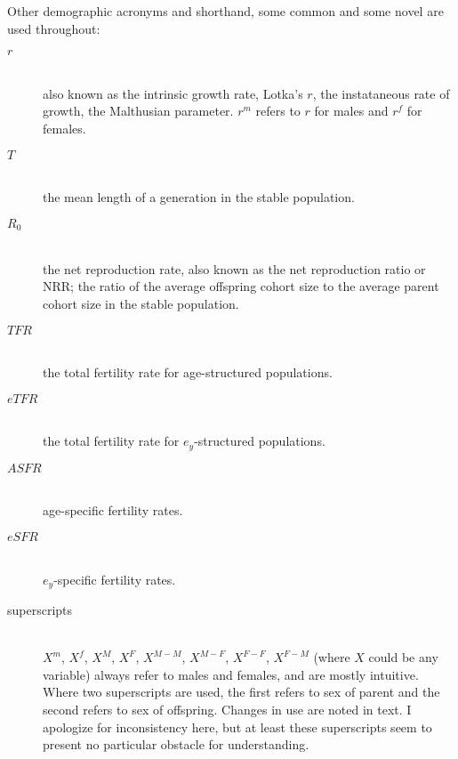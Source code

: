 Other demographic acronyms and shorthand, some common and some novel are used
throughout:
\begin{description}
  \item[$r$] \hfill \\ also known as the intrinsic growth rate, Lotka's $r$, the
  instataneous rate of growth, the Malthusian parameter. $r^m$ refers to $r$ for
  males and $r^f$ for females.
  \item [$T$] \hfill \\ the mean length of a generation in the stable
  population.
  \item [$R_0$] \hfill \\ the net reproduction rate, also known as the net
  reproduction ratio or NRR; the ratio of the average offspring cohort size to the average
  parent cohort size in the stable population.
  \item [$TFR$] \hfill \\ the total fertility rate for age-structured
  populations.
  \item [$eTFR$] \hfill \\ the total fertility rate for $e_y$-structured
  populations.
  \item [$ASFR$] \hfill \\ age-specific fertility rates.
  \item [$eSFR$] \hfill \\ $e_y$-specific fertility rates.
  \item [superscripts] \hfill \\ ${X}^m$, ${X}^f$, ${X}^M$, ${X}^F$,
  ${X}^{M-M}$, ${X}^{M-F}$, ${X}^{F-F}$, ${X}^{F-M}$ (where $X$ could be any variable) always
  refer to males and females, and are mostly intuitive. Where two
  superscripts are used, the first refers to sex of parent and the second
  refers to sex of offspring. Changes in use are noted in text. I apologize for
  inconsistency here, but at least these superscripts seem to present no
  particular obstacle for understanding.
\end{description}
